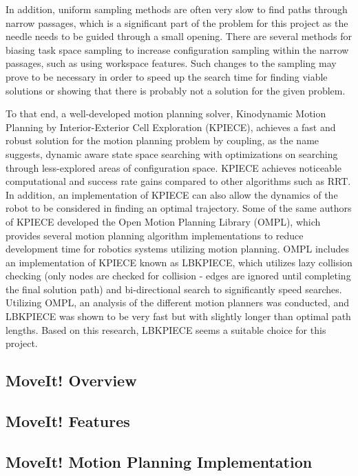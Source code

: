 \documentclass[12pt]{report}
\begin{document}
In addition, uniform sampling methods are often very slow to find paths through narrow passages, which is a significant part of the problem for this project as the needle needs to be guided through a small opening. There are several methods for biasing task space sampling to increase configuration sampling within the narrow passages, such as using workspace features. \cite{workspaceBiasing} Such changes to the sampling may prove to be necessary in order to speed up the search time for finding viable solutions or showing that there is probably not a solution for the given problem. 

To that end, a well-developed motion planning solver, Kinodynamic Motion Planning by Interior-Exterior Cell Exploration (KPIECE), achieves a fast and robust solution for the motion planning problem by coupling, as the name suggests, dynamic aware state space searching with optimizations on searching through less-explored areas of configuration space. \cite{kpiece} KPIECE achieves noticeable computational and success rate gains compared to other algorithms such as RRT. \cite{kpiece} In addition, an implementation of KPIECE can also allow the dynamics of the robot to be considered in finding an optimal trajectory. Some of the same authors of KPIECE developed the Open Motion Planning Library (OMPL), which provides several motion planning algorithm implementations to reduce development time for robotics systems utilizing motion planning. \cite{ompl} OMPL includes an implementation of KPIECE known as LBKPIECE, which utilizes lazy collision checking (only nodes are checked for collision - edges are ignored until completing the final solution path) and bi-directional search to significantly speed searches. Utilizing OMPL, an analysis of the different motion planners was conducted, and LBKPIECE was shown to be very fast but with slightly longer than optimal path lengths. \cite{omplBenchmarks} Based on this research, LBKPIECE seems a suitable choice for this project.


\subsection{MoveIt! Overview}

\subsection{MoveIt! Features}

\subsection{MoveIt! Motion Planning Implementation}
\end{document}
